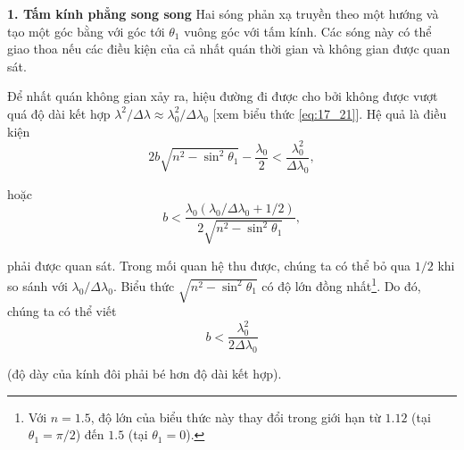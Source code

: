 \textbf{1. Tấm kính phẳng song song}
Hai sóng phản xạ truyền theo một hướng và tạo một góc bằng với góc tới $\theta_1$ vuông góc với tấm kính.
Các sóng này có thể giao thoa nếu các điều kiện của cả nhất quán thời gian và không gian được quan sát.

Để nhất quán không gian xảy ra, hiệu đường đi được cho bởi  không được vượt quá độ dài kết hợp $\lambda^2/\Delta{\lambda}\approx\lambda_0^2/\Delta{\lambda_0}$ [xem biểu thức \eqref{eq:17_21}].
Hệ quả là điều kiện
\begin{equation*}
    2b \sqrt{n^2 - \sin^2\theta_1} - \frac{\lambda_0}{2} < \frac{\lambda_0^2}{\Delta{\lambda_0}},
\end{equation*}

\noindent
hoặc
\begin{equation*}
    b < \frac{\lambda_0 (\lambda_0/\Delta{\lambda_0} + 1/2)}{2 \sqrt{n^2 - \sin^2\theta_1}},
\end{equation*}

\noindent
phải được quan sát.
Trong mối quan hệ thu được, chúng ta có thể bỏ qua $1/2$
khi so sánh với $\lambda_0/\Delta{\lambda_0}$.
Biểu thức $\sqrt{n^2-\sin^2\theta_1}$ có độ lớn đồng nhất\footnote{Với $n=1.5$, độ lớn của biểu thức này thay đổi trong giới hạn từ $1.12$ (tại $\theta_1=\pi/2$) đến $1.5$ (tại $\theta_1=0$).}.
Do đó, chúng ta có thể viết
\begin{equation}\label{eq:17_35}
    b < \frac{\lambda_0^2}{2 \Delta{\lambda_0}}
\end{equation}

\noindent
(độ dày của kính đôi phải bé hơn độ dài kết hợp). 


